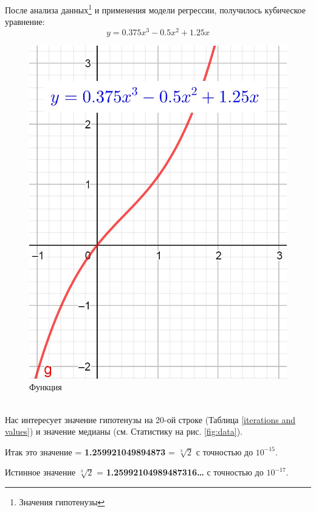 \documentclass[12pt, letterpaper, oneside]{report}
\begin{document}
После анализа данных\footnote{Значения гипотенузы} и применения модели регрессии, получилось кубическое уравнение:
\begin{equation}
y=0.375x^{3}-0.5x^{2}+1.25x
\end{equation}
\begin{figure}[h]
	\centering
	\includegraphics[width=0.25\linewidth]{images/g_x_func.jpg}
	\caption{Функция}
	\label{fig:function}
\end{figure}\\
\newpage
Нас интересует значение гипотенузы на 20-ой строке (Таблица \ref{iterations and values}) и значение медианы (см. Статистику на рис. \ref{fig:data}).

\begin{center}
	Итак это значение = \textbf{1.259921049894873} = $\sqrt[3]{2}$ с точностью до $10^{-15}$.
\end{center}
\vspace{5pt}
\begin{center}
Истинное значение $\sqrt[3]{2}$ = \textbf{1.25992104989487316…} с точностью до $10^{-17}$.\cite{B}
\end{center}
\vspace{5pt}
\end{document}
